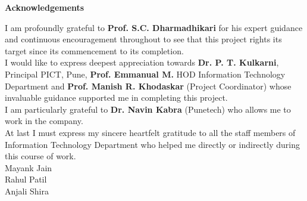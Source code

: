 \begin{center}
\thispagestyle{empty}
\LARGE{\textbf{Acknowledgements}}\\[1cm]
\end{center}
\linespread{1.13}
\Large{I am profoundly grateful to \textbf{Prof. S.C. Dharmadhikari} for his expert guidance
and continuous encouragement throughout to see that this project rights its
target since its commencement to its completion.}\\[1cm]
\Large{I would like to express deepest appreciation towards \textbf{Dr. P. T. Kulkarni},
Principal PICT, Pune, \textbf{Prof. Emmanual M.} HOD Information Technology
Department and \textbf{Prof. Manish R. Khodaskar} (Project Coordinator) whose
invaluable guidance supported me in completing this project.}\\[1cm]
\Large{I am particularly grateful to \textbf{Dr. Navin Kabra}
(Punetech) who allows me to work in the company.\\[1cm]
\Large{At last I must express my sincere heartfelt gratitude to all the staff members
of Information Technology Department who helped me directly or
indirectly during this course of work.}\\[2cm]
\LARGE{\hspace*{4.0in} Mayank Jain}\\
\LARGE{\hspace*{4.0in} Rahul Patil}\\
\LARGE\hspace*{4.0in} Anjali Shira}\\
\newpage
